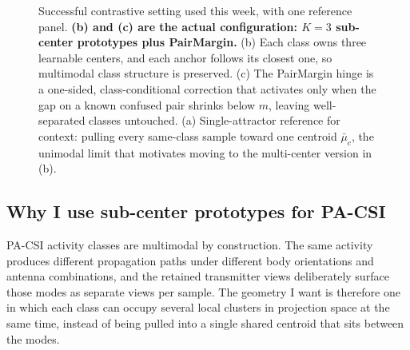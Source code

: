 \documentclass[11pt]{article}
\begin{document}
\begin{figure}[H]
{%
}
\caption{Successful contrastive setting used this week, with one reference panel. \textbf{(b) and (c) are the actual configuration: $K=3$ sub-center prototypes plus PairMargin.} (b) Each class owns three learnable centers, and each anchor follows its closest one, so multimodal class structure is preserved. (c) The PairMargin hinge is a one-sided, class-conditional correction that activates only when the gap on a known confused pair shrinks below $m$, leaving well-separated classes untouched. (a) Single-attractor reference for context: pulling every same-class sample toward one centroid $\bar{\mu}_c$, the unimodal limit that motivates moving to the multi-center version in (b).}
\label{fig:geometry}
\end{figure}

\subsection*{Why I use sub-center prototypes for PA-CSI}

PA-CSI activity classes are multimodal by construction. The same activity produces different propagation paths under different body orientations and antenna combinations, and the retained transmitter views deliberately surface those modes as separate views per sample. The geometry I want is therefore one in which each class can occupy several local clusters in projection space at the same time, instead of being pulled into a single shared centroid that sits between the modes.
\end{document}
